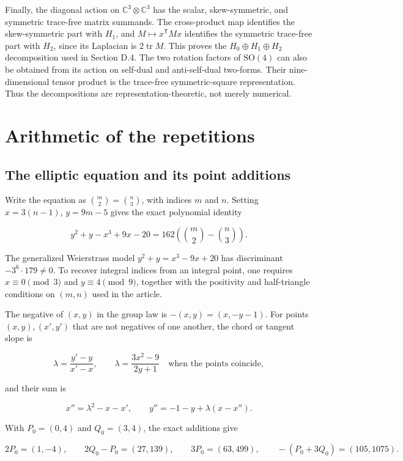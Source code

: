 \documentclass[11pt,a4paper]{article}
\begin{document}
Finally, the diagonal action on \(\mathbb C^3\otimes\mathbb C^3\) has the scalar, skew-symmetric, and symmetric trace-free matrix summands. The cross-product map identifies the skew-symmetric part with \(H_1\), and \(M\mapsto x^{\mathsf T}Mx\) identifies the symmetric trace-free part with \(H_2\), since its Laplacian is \(2\operatorname{tr}M\). This proves the \(H_0\oplus H_1\oplus H_2\) decomposition used in Section D.4. The two rotation factors of \(\mathrm{SO}(4)\) can also be obtained from its action on self-dual and anti-self-dual two-forms. Their nine-dimensional tensor product is the trace-free symmetric-square representation. Thus the decompositions are representation-theoretic, not merely numerical.

\section{Arithmetic of the repetitions}\label{sec:arithmetic}

\subsection{The elliptic equation and its point additions}\label{subsec:E1}

Write the equation as \(\binom m2=\binom n3\), with indices \(m\) and \(n\). Setting \(x=3(n-1)\), \(y=9m-5\) gives the exact polynomial identity

\[
y^2+y-x^3+9x-20
=162\left(\binom m2-\binom n3\right).
\]

The generalized Weierstrass model \(y^2+y=x^3-9x+20\) has discriminant \(-3^6\cdot179\ne0\). To recover integral indices from an integral point, one requires \(x\equiv0\pmod3\) and \(y\equiv4\pmod9\), together with the positivity and half-triangle conditions on \((m,n)\) used in the article.

The negative of \((x,y)\) in the group law is \(-(x,y)=(x,-y-1)\). For points \((x,y),(x',y')\) that are not negatives of one another, the chord or tangent slope is

\[
\lambda=\frac{y'-y}{x'-x},\qquad
\lambda=\frac{3x^2-9}{2y+1}\quad\text{when the points coincide},
\]

and their sum is

\[
x''=\lambda^2-x-x',\qquad
y''=-1-y+\lambda(x-x'').
\]

With \(P_0=(0,4)\) and \(Q_0=(3,4)\), the exact additions give

\[
2P_0=(1,-4),\qquad
2Q_0-P_0=(27,139),\qquad
3P_0=(63,499),\qquad
-(P_0+3Q_0)=(105,1075).
\]
\end{document}

